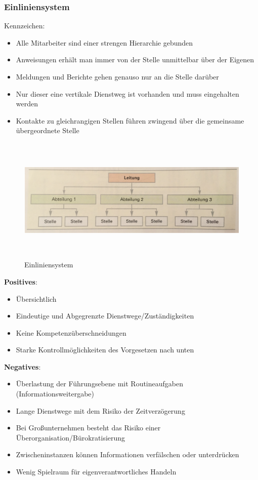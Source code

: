 \documentclass[10pt]{article}
\begin{document}
\subsubsection{Einliniensystem}
Kennzeichen: \\
\begin{itemize}
\item Alle Mitarbeiter sind einer strengen Hierarchie gebunden
\item Anweisungen erhält man immer von der Stelle unmittelbar \"uber der Eigenen
\item Meldungen und Berichte gehen genauso nur an die Stelle darüber
\item Nur dieser eine vertikale Dienstweg ist vorhanden und muss eingehalten werden
\item Kontakte zu gleichrangigen Stellen führen zwingend über die gemeinsame übergeordnete Stelle
\end{itemize}
\begin{figure}[H]
\begin{center}
  \includegraphics[height=6cm]{einlinien.png}
  \end{center}
  \caption{Einliniensystem}
  \label{fig:Einliniensystem}
\end{figure}
\textbf{Positives}:
\begin{itemize}
\item \"Ubersichtlich
\item Eindeutige und Abgegrenzte Dienstwege/Zust\"andigkeiten
\item Keine Kompetenz\"uberschneidungen
\item Starke Kontrollmöglichkeiten des Vorgesetzen nach unten
\end{itemize}
\textbf{Negatives}:
\begin{itemize}
\item Überlastung der Führungsebene mit Routineaufgaben (Informationsweitergabe)
\item Lange Dienstwege mit dem Risiko der Zeitverzögerung
\item Bei Großunternehmen besteht das Risiko einer Überorganisation/Bürokratisierung
\item Zwischeninstanzen können Informationen verfälschen oder unterdrücken
\item Wenig Spielraum für eigenverantwortliches Handeln
\end{itemize}
\end{document}
